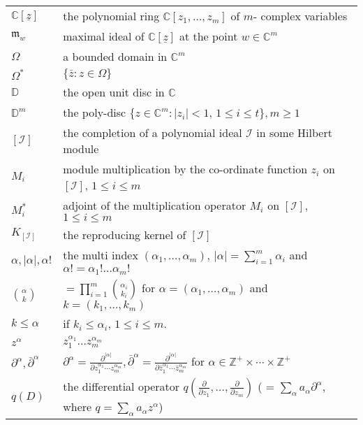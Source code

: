 \documentclass[11pt]{amsart}
\theoremstyle{definition}
\numberwithin{equation}{section}
\begin{document}
\begin{tabular}{ll}
${{\mathbb C}}[\underline z]$ & the polynomial ring ${{\mathbb C}}[z_1,\ldots,z_m]$ of $m$- complex variables  \\

$\mathfrak m_w$ & maximal ideal of ${{\mathbb C}}[\underline z]$ at the point $w\in{{\mathbb C}}^m$\\

$\Omega$ & a bounded domain in ${{\mathbb C}}^m$ \\

$\Omega^*$ & $\{\bar z: z\in\Omega\}$ \\

$\mathbb D$ & the open unit disc in ${{\mathbb C}}$\\

$\mathbb D^m$ & the poly-disc $\{z\in{{\mathbb C}}^m:|z_i|<1,\, 1\leq i\leq t\},m\geq 1$\\

$[\mathcal I]$ & the completion of a polynomial ideal $\mathcal I$ in some Hilbert module\\

$M_i$ & module multiplication by the co-ordinate function $z_i$ on $[\mathcal I]$, $1\leq i\leq m$\\

$M_i^*$ & adjoint of the multiplication operator $M_i$ on $[\mathcal I]$, $1\leq i\leq m$\\

$K_{[\mathcal I]}$ & the reproducing kernel of $[\mathcal I]$\\

$\alpha, |\alpha|, \alpha !$ & the multi index $(\alpha_1,\ldots,\alpha_m)$, $|\alpha|=\sum_{i=1}^m\alpha_i$ and $\alpha ! = \alpha_1!\ldots\alpha_m!$\\

$\binom{\alpha}{k}$ &  $= \prod_{i=1}^m\binom{\alpha_i}{k_i}$ for $\alpha = (\alpha_1,\ldots,\alpha_m)$ and  $k=(k_1,\ldots,k_m)$\\

$k\leq \alpha$ & if $k_i\leq\alpha_i$,  $1\leq i\leq m$.\\

$z^\alpha$ & $z_1^{\alpha_1}\ldots z_m^{\alpha_m}$\\

$\partial^{\alpha},\bar\partial^{\alpha}$ & $\partial^{\alpha}=\frac{\partial^{|\alpha|}}{\partial z_1^{\alpha_1}\cdots z_m^{\alpha_m}},\bar{\partial}^{\alpha}=\frac{\partial^{|\alpha|}}{\partial\bar{z}_1^{\alpha_1}\cdots \bar{z}_m^{\alpha_m}}$ for $\alpha \in
{\mathbb Z^+\times\cdots\times\mathbb Z^+}$\\
$q(D)$ & the differential operator $q(\tfrac{\partial}{\partial z_1}, \ldots , \tfrac{\partial}{\partial z_m})$  ( = $\sum_{\alpha}a_{\alpha}\partial^{\alpha}$, where $q = \sum_{\alpha}a_{\alpha}z^{\alpha}$) \\


\end{tabular}
\end{document}
